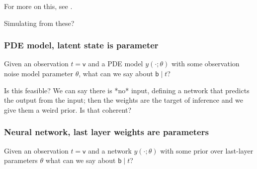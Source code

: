 \documentclass{article}
\newcommand{\vv}[1]{\boldsymbol{#1}}
\newcommand{\mm}[1]{\mathrm{#1}}
\newcommand{\rv}[1]{\mathsf{#1}}
\newcommand{\vrv}[1]{\vv{\rv{#1}}}
\newcommand{\gvn}{\mid}
\begin{document}
For more on this, see \cite{DaxbergerLaplace2021}.~


Simulating from these?

\subsubsection{PDE model, latent state is parameter}
Given an observation \(t=\vrv{v}\) and a PDE model \(y(\cdot;\theta)\) with some observation noise model parameter \(\theta\), what can we say about \(\rv{b}\gvn t\)?

Is this feasible? We can say there is *no* input, defining a network that predicts the output from the input; then the weights are the target of inference and we give them a weird prior.
Is that coherent?

\subsubsection{Neural network, last layer weights are parameters}
Given an observation \(t=\vrv{v}\) and a network \(y(\cdot;\theta)\) with some prior over last-layer parameters \(\theta\) what can we say about \(\rv{b}\gvn t\)?
\end{document}
